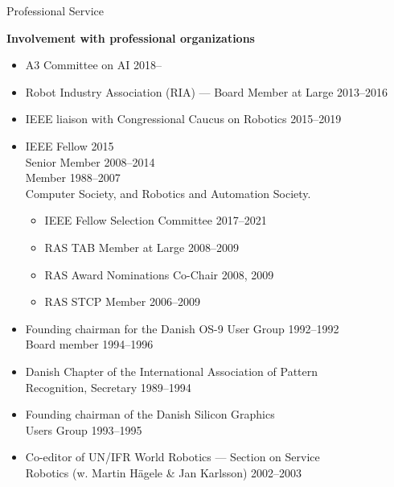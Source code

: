 \documentclass{article}
\begin{document}
\begin{cv}
\begin{cvlist}{Professional Service}
		\item {\bf Involvement with professional organizations}
		\begin{itemize}
			\item A3 Committee on AI \cftdotfill{\cftdotsep} 2018--
			\item Robot Industry Association (RIA) --- Board Member at Large
			      \cftdotfill{\cftdotsep} 2013--2016
			\item IEEE liaison with Congressional Caucus on Robotics
			      \cftdotfill{\cftdotsep}  2015--2019
			\item IEEE Fellow \cftdotfill{\cftdotsep} 2015\\
			      Senior Member \cftdotfill{\cftdotsep} 2008--2014\\
			      Member \cftdotfill{\cftdotsep} 1988--2007\\
			      Computer Society, and Robotics and Automation Society.
			      \begin{itemize}
				      \item IEEE Fellow Selection Committee \cftdotfill{\cftdotsep} 2017--2021
				      \item RAS TAB Member at Large \cftdotfill{\cftdotsep} 2008--2009
				      \item RAS Award Nominations Co-Chair \cftdotfill{\cftdotsep} 2008, 2009
				      \item RAS STCP Member \cftdotfill{\cftdotsep} 2006--2009
			      \end{itemize}
			\item Founding chairman for the Danish OS-9 User Group
			      \cftdotfill{\cftdotsep} 1992--1992\\ Board member
			      \cftdotfill{\cftdotsep} 1994--1996
			\item Danish Chapter of the International Association of
			      Pattern\\ Recognition, Secretary \cftdotfill{\cftdotsep}
			      1989--1994
			\item Founding chairman of the Danish Silicon Graphics \\Users Group
			      \cftdotfill{\cftdotsep} 1993--1995
			\item Co-editor of UN/IFR World Robotics --- Section on
			      Service\\ Robotics (w. Martin H\"agele \& Jan Karlsson)
			      \cftdotfill{\cftdotsep} 2002--2003
		\end{itemize}


\end{cvlist}
\end{cv}
\end{document}
